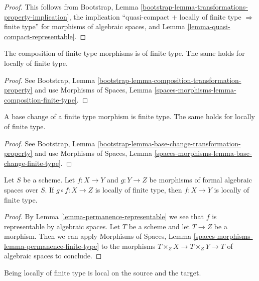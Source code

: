 \begin{proof}
This follows from Bootstrap, Lemma
\ref{bootstrap-lemma-transformations-property-implication},
the implication ``quasi-compact $+$ locally of finite type
$\Rightarrow$ finite type'' for morphisms of algebraic spaces, and
Lemma \ref{lemma-quasi-compact-representable}.
\end{proof}

\begin{lemma}
\label{lemma-composition-finite-type}
The composition of finite type morphisms is of finite type.
The same holds for locally of finite type.
\end{lemma}

\begin{proof}
See Bootstrap, Lemma \ref{bootstrap-lemma-composition-transformation-property}
and use Morphisms of Spaces, Lemma
\ref{spaces-morphisms-lemma-composition-finite-type}.
\end{proof}

\begin{lemma}
\label{lemma-base-change-finite-type}
A base change of a finite type morphism is finite type.
The same holds for locally of finite type.
\end{lemma}

\begin{proof}
See Bootstrap, Lemma \ref{bootstrap-lemma-base-change-transformation-property}
and use Morphisms of Spaces, Lemma
\ref{spaces-morphisms-lemma-base-change-finite-type}.
\end{proof}

\begin{lemma}
\label{lemma-permanence-finite-type}
Let $S$ be a scheme. Let $f : X \to Y$ and $g : Y \to Z$ be morphisms of
formal algebraic spaces over $S$. If $g \circ f : X \to Z$ is locally of
finite type, then $f : X \to Y$ is locally of finite type.
\end{lemma}

\begin{proof}
By Lemma \ref{lemma-permanence-representable} we see that $f$ is
representable by algebraic spaces. Let $T$ be a scheme and let
$T \to Z$ be a morphism. Then we can apply
Morphisms of Spaces, Lemma \ref{spaces-morphisms-lemma-permanence-finite-type}
to the morphisms
$T \times_Z X \to T \times_Z Y \to T$ of algebraic spaces to conclude.
\end{proof}

\noindent
Being locally of finite type is local on the source and the target.

